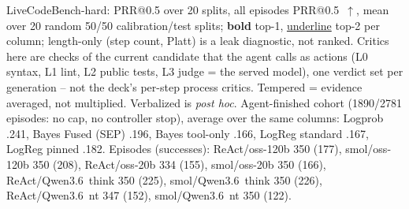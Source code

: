 \documentclass[10pt, aspectratio=43]{beamer}
\begin{document}
\begin{frame}{LiveCodeBench-hard: PRR@0.5 over 20 splits, all episodes}
\vspace{0.25em}
\fontsize{6}{7}\selectfont
PRR@0.5~$\uparrow$, mean over 20 random 50/50 calibration/test splits; \textbf{bold} top-1,
\underline{underline} top-2 per column; length-only (step count, Platt) is a leak diagnostic, not ranked.
Critics here are checks of the current candidate that the agent calls as actions (L0 syntax, L1 lint,
L2 public tests, L3 judge = the served model), one verdict set per generation -- not the deck's
per-step process critics. Tempered = evidence averaged, not multiplied. Verbalized is \emph{post hoc}.
Agent-finished cohort (1890/2781 episodes: no cap, no controller stop), average over the same columns: Logprob .241, Bayes Fused (SEP) .196, Bayes tool-only .166, LogReg standard .167, LogReg pinned .182.
Episodes (successes): ReAct/oss-120b 350 (177), smol/oss-120b 350 (208), ReAct/oss-20b 334 (155), smol/oss-20b 350 (166), ReAct/Qwen3.6~think 350 (225), smol/Qwen3.6~think 350 (226), ReAct/Qwen3.6~nt 347 (152), smol/Qwen3.6~nt 350 (122).
\end{frame}
\end{document}
